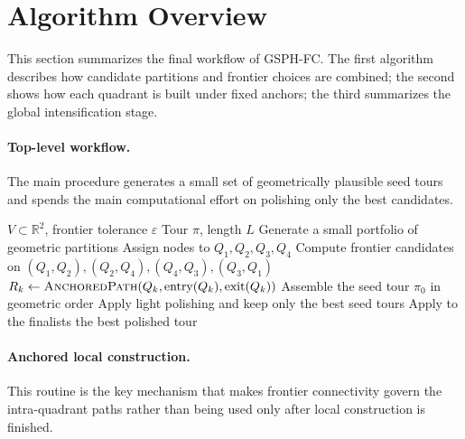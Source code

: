 \documentclass[runningheads]{llncs}
\begin{document}
\section{Algorithm Overview}
\label{sec:algorithm}

This section summarizes the final workflow of GSPH-FC. The first
algorithm describes how candidate partitions and frontier choices are
combined; the second shows how each quadrant is built under fixed
anchors; the third summarizes the global intensification stage.

\paragraph{Top-level workflow.}
The main procedure generates a small set of geometrically plausible seed
tours and spends the main computational effort on polishing only the
best candidates.

\begin{algorithm}
\caption{GSPH-FC --- top-level procedure}
\label{alg:gsph}
\begin{algorithmic}[1]
\Require $V\subset\mathbb{R}^2$, frontier tolerance $\varepsilon$
\Ensure Tour $\pi$, length $L$
\State Generate a small portfolio of geometric partitions
  \State Assign nodes to $Q_1,Q_2,Q_3,Q_4$
  \State Compute frontier candidates on
         $(Q_1,Q_2),(Q_2,Q_4),(Q_4,Q_3),(Q_3,Q_1)$
      \State $R_k\gets\Call{AnchoredPath}{Q_k,\text{entry}(Q_k),\text{exit}(Q_k)}$
    \EndFor
    \State Assemble the seed tour $\pi_0$ in geometric order
    \State Apply light polishing and keep only the best seed tours
  \EndFor
\EndFor
\State Apply  to the finalists
\State \Return the best polished tour
\end{algorithmic}
\end{algorithm}

\paragraph{Anchored local construction.}
This routine is the key mechanism that makes frontier connectivity
govern the intra-quadrant paths rather than being used only after local
construction is finished.
\end{document}
